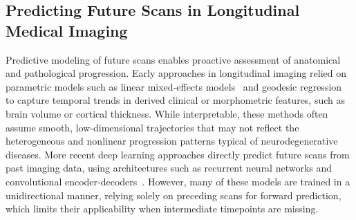 


\subsection{Predicting Future Scans in Longitudinal Medical Imaging}


Predictive modeling of future scans enables proactive assessment of anatomical and pathological progression. Early approaches in longitudinal imaging relied on parametric models such as linear mixed-effects models~\cite{mcdade2018longitudinal} and geodesic regression~\cite{fishbaugh2020} to capture temporal trends in derived clinical or morphometric features, such as brain volume or cortical thickness. While interpretable, these methods often assume smooth, low-dimensional trajectories that may not reflect the heterogeneous and nonlinear progression patterns typical of neurodegenerative diseases. More recent deep learning approaches directly predict future scans from past imaging data, using architectures such as recurrent neural networks and convolutional encoder-decoders~\cite{bai2024noder}. However, many of these models are trained in a unidirectional manner, relying solely on preceding scans for forward prediction, which limits their applicability when intermediate timepoints are missing.

